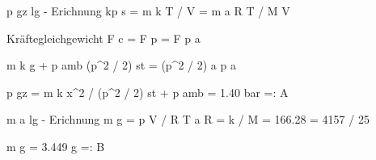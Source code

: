 p gz  
lg - Erichnung  
kp s = m k T / V = m a R T / M V  

Kräftegleichgewicht  
F c = F p = F p a  

m k g + p amb (p^2 / 2) st = (p^2 / 2) a p a  

p gz = m k x^2 / (p^2 / 2) st + p amb = 1.40 bar =: A  

m a  
lg - Erichnung  
m g = p V / R T a  
R = k / M = 166.28 = 4157 / 25  

m g = 3.449 g =: B